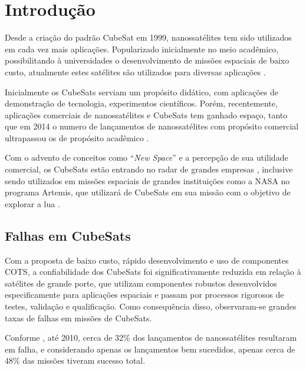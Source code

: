 \chapter{Introdução}\label{cap:intro}

Desde a criação do padrão CubeSat em 1999, nanossatélites tem sido utilizados em cada vez mais aplicações. Popularizado inicialmente no meio acadêmico, possibilitando à universidades o desenvolvimento de missões espaciais de baixo custo, atualmente estes satélites são utilizados para diversas aplicações \cite{modern-small-sats-economics}.

Inicialmente os CubeSats serviam um propósito didático, com aplicações de demonstração de tecnologia, experimentos científicos.
Porém, recentemente, aplicações comerciais de nanossatélites e CubeSats tem ganhado espaço, tanto que em 2014 o numero de lançamentos de nanossatélites com propósito comercial ultrapassou os de propósito acadêmico \cite{modern-small-sats-economics}.

Com o advento de conceitos como “\textit{New Space}” e a percepção de sua utilidade comercial, os CubeSats estão entrando no radar de grandes empresas \cite{modern-small-sats-economics}, inclusive sendo utilizados em missões espaciais de grandes instituições como a NASA no programa Artemis, que utilizará de CubeSats em sua missão com o objetivo de explorar a lua \cite{artemis-plan}.

\section{Falhas em CubeSats}\label{sec:intro-falhas}

Com a proposta de baixo custo, rápido desenvolvimento e uso de componentes \gls{COTS}, a confiabilidade dos CubeSats foi significativamente reduzida em relação à satélites de grande porte, que utilizam componentes robustos desenvolvidos especificamente para aplicações espaciais e passam por processos rigorosos de testes, validação e qualificação.
Como consequência disso, observaram-se grandes taxas de falhas em missões de CubeSats.

Conforme \textcite{survey-nanosat-missions-2010}, até 2010, cerca de 32\% dos lançamentos de nanossatélites resultaram em falha, e considerando apenas os lançamentos bem sucedidos, apenas cerca de 48\% das missões tiveram sucesso total.

